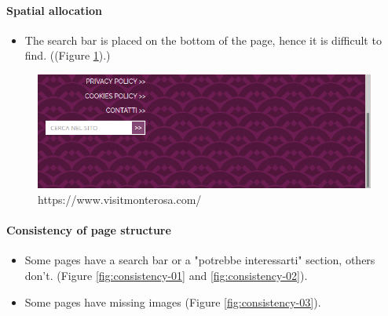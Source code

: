 \documentclass[a4paper, 11pt, parskip=half, headsepline]{scrreprt}
\begin{document}
\paragraph{Spatial allocation}
\begin{itemize}
	\item The search bar is placed on the bottom of the page, hence it is difficult to find. ((Figure \ref{fig:spatial-allocation-01}).)
\end{itemize}

\begin{figure}[H]
	\centering
	\begin{minipage}[t]{0.5\textwidth}
		\centering
		\includegraphics[width=1\linewidth, keepaspectratio]{91-spatial-allocation-searchbar}
		\caption{https://www.visitmonterosa.com/}
		\label{fig:spatial-allocation-01}
	\end{minipage} 
\end{figure}


\paragraph{Consistency of page structure}
\begin{itemize}
	\item Some pages have a search bar or a "potrebbe interessarti" section, others don't. (Figure \ref{fig:consistency-01} and \ref{fig:consistency-02}).
    \item Some pages have missing images (Figure \ref{fig:consistency-03}).
\end{itemize}
\end{document}
